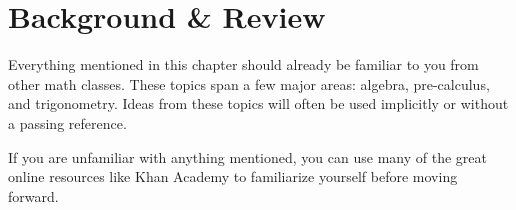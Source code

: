 \chapter{Background \& Review}
Everything mentioned in this chapter should already be familiar to you from other math classes.
These topics span a few major areas: algebra, pre-calculus, and trigonometry.
Ideas from these topics will often be used implicitly or without a passing reference.\bigskip

If you are unfamiliar with anything mentioned, you can use many of the great online resources like Khan Academy to familiarize yourself before moving forward.

